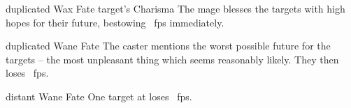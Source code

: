   {duplicated}%
  {Wax}%
  {Fate}%
  {target's Charisma}%
  {The mage blesses the targets with high hopes for their future, bestowing \showDam~\glspl{fp} immediately.}%
  {}

  {duplicated}%
  {Wane}%
  {Fate}%
  {}%
  {The caster mentions the worst possible future for the targets -- the most unpleasant thing which seems reasonably likely.
    They then loses \showDam~\glspl{fp}.
  }%
  {}

  {distant}%
  {Wane}%
  {Fate}%
  {}%
  {One target at \spellRange{} loses \showDam~\glspl{fp}.}%
  {}
